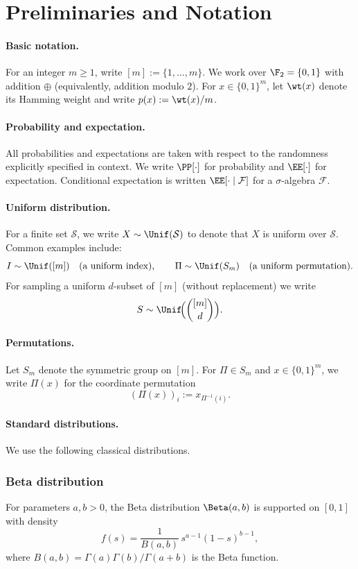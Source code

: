 \section{Preliminaries and Notation}
\label{sec:prelim}

\paragraph{Basic notation.}
For an integer \(m\ge 1\), write \([m]:=\{1,\dots,m\}\).
We work over \(\F_2=\{0,1\}\) with addition \(\oplus\) (equivalently, addition modulo \(2\)).
For \(x\in\{0,1\}^m\), let \(\wt(x)\) denote its Hamming weight and write \(p(x):=\wt(x)/m\).

\paragraph{Probability and expectation.}
All probabilities and expectations are taken with respect to the randomness explicitly specified in context.
We write \(\PP[\cdot]\) for probability and \(\EE[\cdot]\) for expectation. Conditional expectation is written
\(\EE[\cdot\mid \mathcal{F}]\) for a \(\sigma\)-algebra \(\mathcal{F}\).

\paragraph{Uniform distribution.}
For a finite set \(\mathcal{S}\), we write \(X\sim \Unif(\mathcal{S})\) to denote that \(X\) is uniform over \(\mathcal{S}\).
Common examples include:
\[
I\sim \Unif([m]) \quad\text{(a uniform index)},\qquad
\Pi\sim \Unif(S_m) \quad\text{(a uniform permutation)}.
\]
For sampling a uniform \(d\)-subset of \([m]\) (without replacement) we write
\[
S\sim \Unif\!\Big(\binom{[m]}{d}\Big).
\]

\paragraph{Permutations.}
Let \(S_m\) denote the symmetric group on \([m]\).
For \(\Pi\in S_m\) and \(x\in\{0,1\}^m\), we write \(\Pi(x)\) for the coordinate permutation
\[
(\Pi(x))_i := x_{\Pi^{-1}(i)}.
\]

\paragraph{Standard distributions.}
We use the following classical distributions.

\subsubsection*{Beta distribution}
For parameters \(a,b>0\), the Beta distribution \(\Beta(a,b)\) is supported on \([0,1]\) with density
\[
f(s) = \frac{1}{B(a,b)}\, s^{a-1}(1-s)^{b-1},
\]
where \(B(a,b)=\Gamma(a)\Gamma(b)/\Gamma(a+b)\) is the Beta function.

